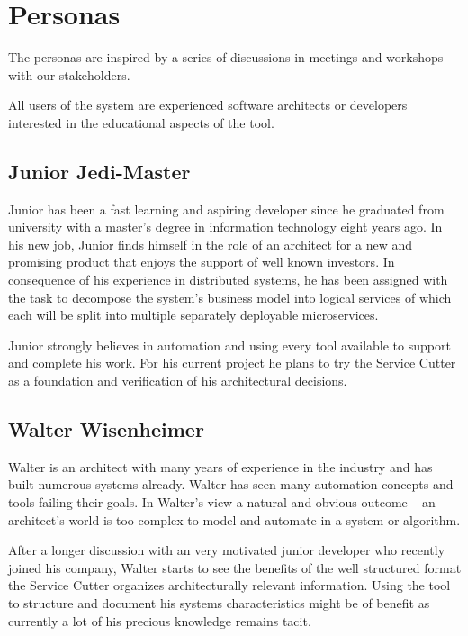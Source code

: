 
\section{Personas}

The personas are inspired by a series of discussions in meetings and workshops with our stakeholders.

All users of the system are experienced software architects or developers interested in the educational aspects of the tool.

\subsection{Junior Jedi-Master}

Junior has been a fast learning and aspiring developer since he graduated from university with a master's degree in information technology eight years ago. In his new job, Junior finds himself in the role of an architect for a new and promising product that enjoys the support of well known investors. In consequence of his experience in distributed systems, he has been assigned with the task to decompose the system's business model into logical services of which each will be split into multiple separately deployable microservices. 

Junior strongly believes in automation and using every tool available to support and complete his work. For his current project he plans to try the Service Cutter as a foundation and verification of his architectural decisions. 


\subsection{Walter Wisenheimer}

Walter is an architect with many years of experience in the industry and has built numerous systems already. Walter has seen many automation concepts and tools failing their goals. In Walter's view a natural and obvious outcome -- an architect's world is too complex to model and automate in a system or algorithm. 

After a longer discussion with an very motivated junior developer who recently joined his company, Walter starts to see the benefits of the well structured format the Service Cutter organizes architecturally relevant information. Using the tool to structure and document his systems characteristics might be of benefit as currently a lot of his precious knowledge remains tacit\cite{zimmermann2015architectural}. 

